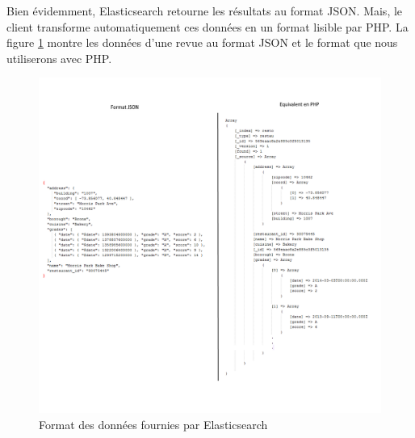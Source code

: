 \newpage
Bien évidemment, Elasticsearch retourne les résultats au format JSON. Mais, le client transforme automatiquement ces données en un format lisible par PHP. La figure \ref{datajsonPhp} montre les données d'une revue au format JSON et le format que nous utiliserons avec PHP.

\begin{figure}[H]
        \centering
        \includegraphics[width=\textwidth]{figure/dataJSONPHP.png}
            \caption{Format des données fournies par Elasticsearch}
            \label{datajsonPhp}
\end{figure}

